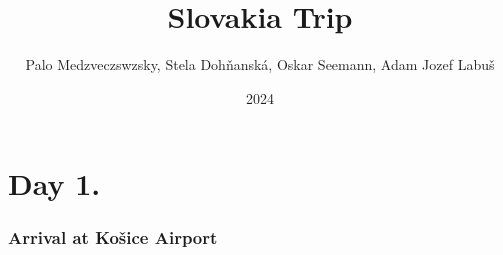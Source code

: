 \documentclass{beamer}
\title{Slovakia Trip}
\author{Palo Medzveczswzsky, Stela Dohňanská, Oskar Seemann, Adam Jozef Labuš}
\date{2024}
\begin{document}
	\section{Day 1.}

	\begin{frame}
		\frametitle{Arrival at Košice Airport}



\end{frame}
\end{document}
